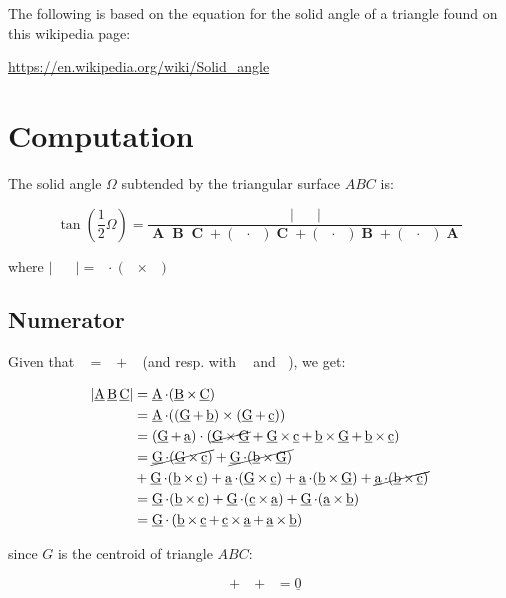 \documentclass[10pt,a4paper]{article}
\newcommand{\ud}[1]{\underline{#1}}
\DeclareMathOperator{\A}{\ud{A}}
\DeclareMathOperator{\B}{\ud{B}}
\DeclareMathOperator{\C}{\ud{C}}
\DeclareMathOperator{\G}{\ud{G}}
\DeclareMathOperator{\av}{\ud{a}}
\DeclareMathOperator{\bv}{\ud{b}}
\DeclareMathOperator{\cv}{\ud{c}}
\DeclareMathOperator{\An}{\mathbf{A}}
\DeclareMathOperator{\Bn}{\mathbf{B}}
\DeclareMathOperator{\Cn}{\mathbf{C}}
\begin{document}
The following is based on the equation for the solid angle of a triangle found
on this wikipedia page:

\href{https://wikimedia.org/api/rest_v1/media/math/render/svg/3f1c5eeb500549deecf720c7ab47d513225e3e39}{https://en.wikipedia.org/wiki/Solid\_angle}


\section{Computation}

The solid angle $\Omega$ subtended by the triangular surface $ABC$ is:

$$
\tan \left( \frac{1}{2} \Omega \right)
= \frac{\left|\A \B \C\right|}
{
    \An\Bn\Cn + \left(\A\cdot\B\right)\Cn
    + \left(\A\cdot\C\right)\Bn
    + \left(\B\cdot\C\right)\An
}
$$

where $\left| \A\B\C \right| = \A \cdot (\B \times \C)$


\subsection{Numerator}


Given that $\A = \G + \av$ (and resp. with $\B$ and $\C$), we get:


\begin{align*}
\left| \A \B \C \right|
	& =  \A \cdot (\B \times \C) \\
    & =  \A \cdot ((\G + \bv) \times (\G + \cv)) \\
    & =  (\G + \av) \cdot (\cancel{\G \times \G}
                          + \G \times \cv
                          + \bv \times \G
                          + \bv \times \cv) \\
    & = \cancel{\G \cdot (\G \times \cv)}
                          + \cancel{\G \cdot (\bv \times \G)}\\
         & + \G \cdot (\bv \times \cv)
      + \av \cdot (\G \times \cv)
      + \av \cdot (\bv \times \G)
      + \cancel{\av \cdot (\bv \times \cv)} \\
    & = \G \cdot (\bv \times \cv)
    + \G \cdot (\cv \times \av)
    + \G \cdot (\av \times \bv) \\
    & = \G \cdot \left(\bv \times \cv
    + \cv \times \av
    + \av \times \bv \right)
\end{align*}

since $G$ is the centroid of triangle $ABC$: 

\begin{equation}
    \av + \bv + \cv = \ud{0}
\label{eq1}
\end{equation}
\end{document}
